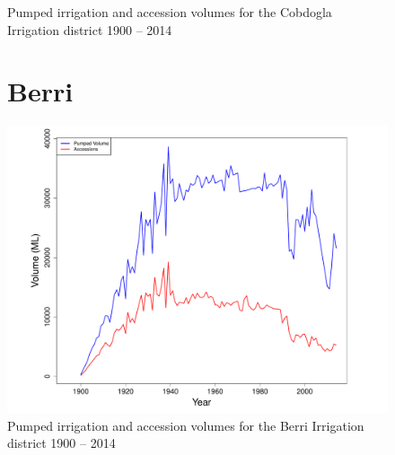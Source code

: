 \documentclass[a4paper, titlepage, 12pt]{article}\usepackage[]{graphicx}\usepackage[]{color}
\makeatletter
\def\maxwidth{ %
  \ifdim\Gin@nat@width>\linewidth
    \linewidth
  \else
    \Gin@nat@width
  \fi
}
\newenvironment{knitrout}{}{} %
\makeatother
\begin{document}
\begin{sffamily}
\begin{appendices}
\begin{figure}
\begin{knitrout}
\end{knitrout}
\caption{Pumped irrigation and accession volumes for the Cobdogla Irrigation district 1900 -- 2014}
\label{fig04}
\end{figure}

\begin{figure}
\section{Berri}
\begin{knitrout}
\color{fgcolor}
\includegraphics[width=\maxwidth]{../figures/Berri-1} 

\end{knitrout}
\caption{Pumped irrigation and accession volumes for the Berri Irrigation district 1900 -- 2014}
\label{fig05}
\end{figure}

\begin{figure}

\end{figure}
\end{appendices}
\end{sffamily}
\end{document}
